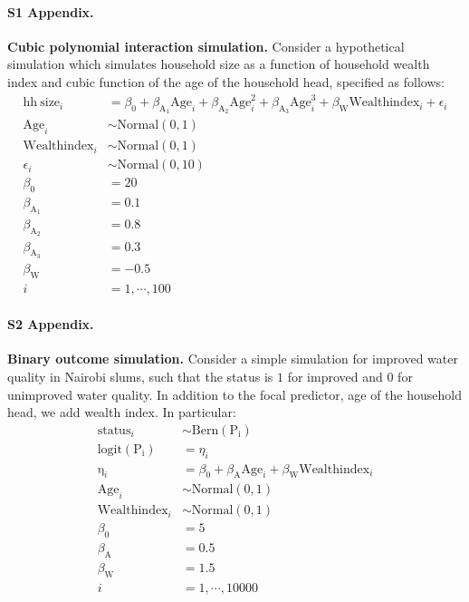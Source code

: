\paragraph*{S1 Appendix.}
\label{S1_Appendix}
{\bf Cubic polynomial interaction simulation.} Consider a hypothetical simulation which simulates household size as a function of household wealth index and cubic function of the age of the household head, specified as follows:
%
\begin{align}\label{sim:lm_cubic}
\mathrm{hh~size}_i &= \beta_0 + \beta_{\mathrm{A_1}}\mathrm{Age}_i + \beta_{\mathrm{A_2}}\mathrm{Age}^2_i + \beta_{\mathrm{A_3}}\mathrm{Age}^3_i + \beta_{\mathrm{W}}\mathrm{Wealthindex}_i + \epsilon_i \nonumber\\
\mathrm{Age}_i &\sim \mathrm{Normal}(0, 1) \nonumber\\
\mathrm{Wealthindex}_i &\sim \mathrm{Normal}(0, 1) \nonumber\\
\epsilon_i &\sim \mathrm{Normal}(0, 10) \nonumber\\
\beta_0 &= 20 \nonumber\\
\beta_{\mathrm{A}_1} &= 0.1 \nonumber\\
\beta_{\mathrm{A}_2} &= 0.8 \nonumber\\
\beta_{\mathrm{A}_3} &= 0.3 \nonumber\\
\beta_{\mathrm{W}} &= -0.5 \nonumber\\
i &= 1,\cdots, 100
\end{align}


\paragraph*{S2 Appendix.}
\label{S2_Appendix}
{\bf Binary outcome simulation.} Consider a simple simulation for improved water quality in Nairobi slums, such that the status is $1$ for improved and $0$ for unimproved water quality. In addition to the focal predictor, age of the household head, we add wealth index. In particular:
%
\begin{align}\label{sim:glm_two_pred}
\mathrm{status}_i &\sim \mathrm{Bern}(\mathrm{P_i}) \nonumber\\
\mathrm{logit}(\mathrm{P_i}) &= \eta_i \nonumber\\
\mathrm{\eta}_i &= \beta_0 + \beta_{\mathrm{A}}\mathrm{Age}_i + \beta_{\mathrm{W}}\mathrm{Wealthindex}_i \nonumber\\
\mathrm{Age}_i &\sim \mathrm{Normal}(0, 1) \nonumber\\
\mathrm{Wealthindex}_i &\sim \mathrm{Normal}(0, 1) \nonumber\\
\beta_0 &= 5 \nonumber\\
\beta_{\mathrm{A}} &= 0.5 \nonumber\\
\beta_{\mathrm{W}} &= 1.5 \nonumber\\
i &= 1,\cdots, 10000
\end{align}

